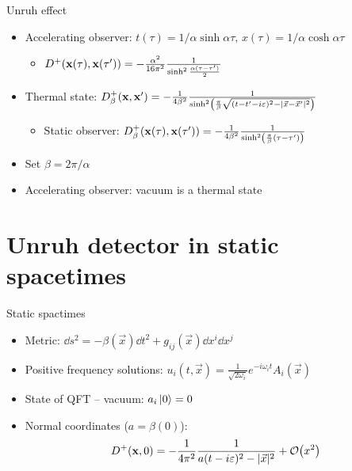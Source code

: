\documentclass{beamer}
\renewcommand{\va}[1]{\vec{#1}}
\begin{document}
\begin{frame}{Unruh effect}
\begin{itemize}
	\item Accelerating observer: \(t(\tau) = 1/\alpha \sinh \alpha\tau,\,x(\tau) = 1/\alpha \cosh \alpha\tau\)
	\begin{itemize}
		\item \(D^+(\vb{x}(\tau), \vb{x}(\tau')) = -\frac{\alpha^2}{16\pi^2} \frac{1}{\sinh^2\frac{\alpha(\tau-\tau')}{2}}\)
	\end{itemize}
	\item Thermal state: \(D^+_\beta(\vb{x},\vb{x}') = -\frac{1}{4\beta^2} \frac{1}{\sinh[2](\frac{\pi}{\beta}\sqrt{(t-t'-i\varepsilon)^2 - |\va{x}-\va{x}'|^2})}\)
	\begin{itemize}
		\item Static observer: \(D^+_\beta(\vb{x}(\tau),\vb{x}(\tau')) = -\frac{1}{4\beta^2} \frac{1}{\sinh[2](\frac{\pi}{\beta} (\tau-\tau'))}\)
	\end{itemize}
	\item Set \(\beta = 2\pi/\alpha\)
	\item Accelerating observer: vacuum is a thermal state
\end{itemize}
\end{frame}

\frame{\setcounter{tocdepth}{1}\hspace{1cm}\tableofcontents}

\section{Unruh detector in static spacetimes}
\begin{frame}{Static spactimes}
\begin{itemize}
	\item Metric: \(\dd{s^2} = -\beta(\va{x}) \dd{t^2} + g_{ij}(\va{x}) \dd{x^i} \dd{x^j}\)
	\item Positive frequency solutions: \(u_{i}(t, \va{x}) = \frac{1}{\sqrt{2\omega_i}}e^{-i\omega_i t} A_i(\va{x})\)
	\item State of QFT -- vacuum: \(a_i \ket*{0} = 0\)
	\item Normal coordinates (\(a = \beta(0)\)): \[D^+(\vb{x},0) = -\frac{1}{4\pi^2} \frac{1}{a(t-i\varepsilon)^2 - |\va{x}|^2} + \order{x^2}\]
\end{itemize}
\end{frame}
\end{document}
